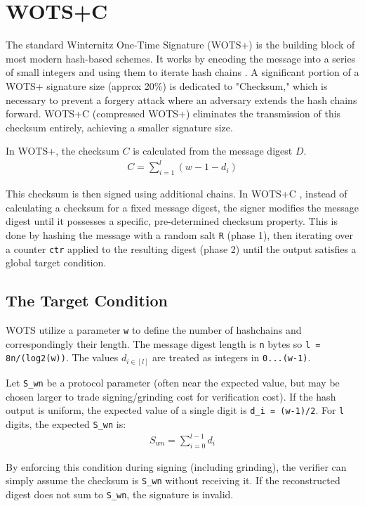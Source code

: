 \section{WOTS+C}
The standard Winternitz One-Time Signature (WOTS+) is the building block of most modern hash-based schemes. It works by encoding the message into a series of small integers and using them to iterate hash chains \cite{hulsing2013wotsplus}. A significant portion of a WOTS+ signature size (approx 20\%) is dedicated to "Checksum," which is necessary to prevent a forgery attack where an adversary extends the hash chains forward. WOTS+C (compressed WOTS+) eliminates the transmission of this checksum entirely, achieving a smaller signature size. 

In WOTS+, the checksum $C$ is calculated from the message digest $D$.
\begin{align}
C = \sum_{i=1}^{l} (w - 1 - d_i)
\end{align}

This checksum is then signed using additional chains. In WOTS+C \cite{wotsc_sphincsc2022}, instead of calculating a checksum for a fixed message digest, the signer modifies the message digest until it possesses a specific, pre-determined checksum property. This is done by hashing the message with a random salt \texttt{R} (phase 1), then iterating over a counter \texttt{ctr} applied to the resulting digest (phase 2) until the output satisfies a global target condition.

\subsection{The Target Condition}
WOTS utilize a parameter \texttt{w} to define the number of hashchains and correspondingly their length. The message digest length is \texttt{n} bytes so \texttt{l = 8n/(log2(w))}. The values $d_{i\in[l]}$ are treated as integers in \texttt{0...(w-1)}. 

Let \texttt{S\_wn} be a protocol parameter (often near the expected value, but may be chosen larger to trade signing/grinding cost for verification cost). If the hash output is uniform, the expected value of a single digit is \texttt{d\_i = (w-1)/2}. For \texttt{l} digits, the expected \texttt{S\_wn} is: 
\begin{align}
S_{wn} = \sum_{i=0}^{l-1}d_i
\end{align}

By enforcing this condition during signing (including grinding), the verifier can simply assume the checksum is \texttt{S\_wn} without receiving it. If the reconstructed digest does not sum to \texttt{S\_wn}, the signature is invalid. 


